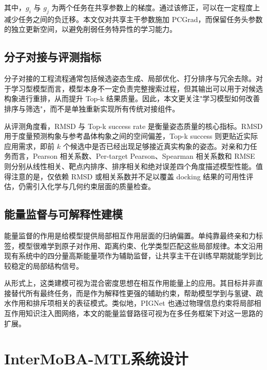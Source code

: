 其中，$g_i$ 与 $g_j$ 为两个任务在共享参数上的梯度。通过该修正，可以在一定程度上减少任务之间的负迁移\cite{yu2020gradient}。本文仅对共享主干参数施加 PCGrad，而保留任务头参数的独立更新空间，以避免削弱任务特异性的学习能力。

\subsection{分子对接与评测指标}

分子对接的工程流程通常包括候选姿态生成、局部优化、打分排序与冗余去除\cite{trott2010autodock,ginosar2023survey}。对于学习型模型而言，模型本身不一定负责完整搜索过程，但其输出可以用于对候选构象进行重排，从而提升 Top-k 结果质量\cite{mcnutt2021gnina,lai2024interformer}。因此，本文更关注"学习模型如何改善排序与筛选"，而不是单独重新实现所有传统对接组件。

从评测角度看，RMSD 与 Top-k success rate 是衡量姿态质量的核心指标\cite{corso2023diffdock}。RMSD 用于度量预测构象与参考晶体构象之间的空间偏差，Top-k success 则更贴近实际应用需求，即前 $k$ 个候选中是否已经出现足够接近真实构象的姿态。对亲和力任务而言，Pearson 相关系数、Per-target Pearson、Spearman 相关系数和 RMSE 则分别从线性相关、靶点内排序、排序相关和绝对误差四个角度描述模型性能\cite{tropsha2010best}。值得注意的是，仅依赖 RMSD 或相关系数并不足以覆盖 docking 结果的可用性评估，仍需引入化学与几何约束层面的质量检查\cite{buttenschoen2024posebusters}。

\subsection{能量监督与可解释性建模}

能量监督的作用是给模型提供局部相互作用层面的归纳偏置。单纯靠最终亲和力标签，模型很难学到原子对作用、距离约束、化学类型匹配这些局部规律。本文沿用现有系统中的四分量高斯能量项作为辅助监督，让共享主干在训练早期就能学到比较稳定的局部结构信号。

从形式上，这类建模可视为混合密度思想在相互作用能量上的应用\cite{bishop1994mixture}。其目标并非直接替代所有最终任务，而是作为解释性更强的辅助约束，帮助模型学到与氢键、疏水作用和排斥项相关的表征模式。类似地，PIGNet\cite{moon2022pignet} 也通过物理信息约束将局部相互作用知识注入图网络，本文的能量监督路径可视为在多任务框架下对这一思路的扩展。

\newpage

\section{InterMoBA-MTL系统设计}
